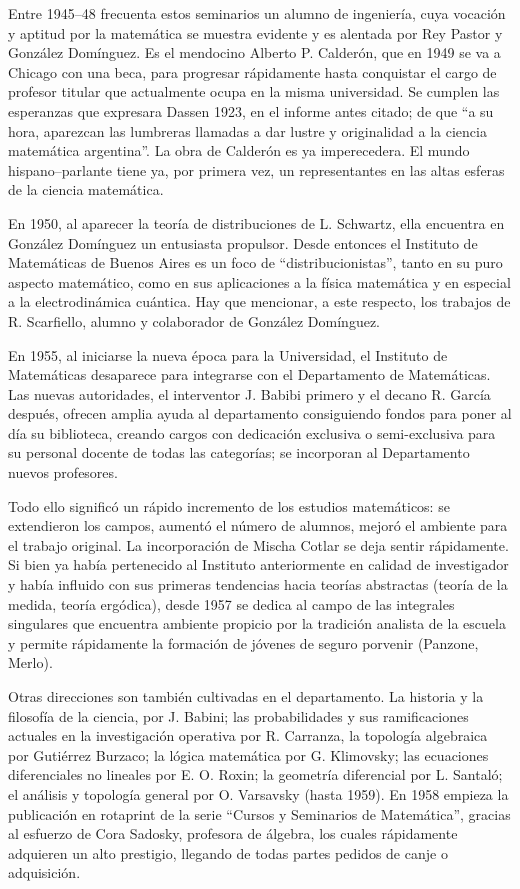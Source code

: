 Entre 1945--48 frecuenta estos seminarios un alumno de ingeniería, cuya
vocación y aptitud por la matemática se muestra evidente y es alentada por Rey
Pastor y González Domínguez. Es el mendocino Alberto P. Calderón, que en 1949
se va a Chicago con una beca, para progresar rápidamente hasta conquistar el
cargo de profesor titular que actualmente ocupa en la misma universidad. Se
cumplen las esperanzas que expresara Dassen 1923, en el informe antes citado;
de que ``a su hora, aparezcan las lumbreras llamadas a dar lustre y
originalidad a la ciencia matemática argentina''. La obra de Calderón es ya
imperecedera. El mundo hispano--parlante tiene ya, por primera vez, un
representantes en las altas esferas de la ciencia matemática.

En 1950, al aparecer la teoría de distribuciones de L. Schwartz, ella encuentra
en González Domínguez un entusiasta propulsor. Desde entonces el Instituto de
Matemáticas de Buenos Aires es un foco de ``distribucionistas'', tanto en su
puro aspecto matemático, como en sus aplicaciones a la física matemática y en
especial a la electrodinámica cuántica. Hay que mencionar, a este respecto, los
trabajos de R. Scarfiello, alumno y colaborador de González Domínguez.

En 1955, al iniciarse la nueva época para la Universidad, el Instituto de
Matemáticas desaparece para integrarse con el Departamento de Matemáticas. Las
nuevas autoridades, el interventor J. Babibi primero y el decano R. García
después, ofrecen amplia ayuda al departamento consiguiendo fondos para poner al
día su biblioteca, creando cargos con dedicación exclusiva o semi-exclusiva
para su personal docente de todas las categorías; se incorporan al Departamento
nuevos profesores. 

Todo ello significó un rápido incremento de los estudios matemáticos: se
extendieron los campos, aumentó el número de alumnos, mejoró el ambiente para
el trabajo original. La incorporación de Mischa Cotlar se deja sentir
rápidamente. Si bien ya había pertenecido al Instituto anteriormente en calidad
de investigador y había influido con sus primeras tendencias hacia teorías
abstractas (teoría de la medida, teoría ergódica), desde 1957 se dedica al
campo de las integrales singulares que encuentra ambiente propicio por la
tradición analista de la escuela y permite rápidamente la formación de jóvenes
de seguro porvenir (Panzone, Merlo).

Otras direcciones son también cultivadas en el departamento. La historia y la
filosofía de la ciencia, por J. Babini; las probabilidades y sus ramificaciones
actuales en la investigación operativa por R. Carranza, la topología algebraica
por Gutiérrez Burzaco; la lógica matemática por G. Klimovsky; las ecuaciones
diferenciales no lineales por E. O. Roxin; la geometría diferencial por L.
Santaló; el análisis y topología general por O. Varsavsky (hasta 1959). En 1958
empieza la publicación en rotaprint de la serie ``Cursos y Seminarios de
Matemática'', gracias al esfuerzo de Cora Sadosky, profesora de álgebra, los
cuales rápidamente adquieren un alto prestigio, llegando de todas partes
pedidos de canje o adquisición.

